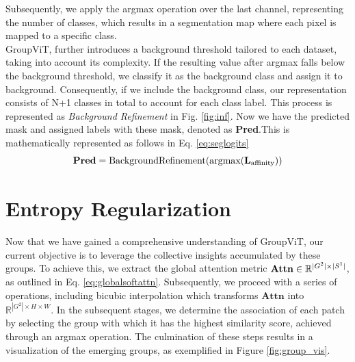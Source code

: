 Subsequently, we apply the argmax operation over the last channel, representing the number of classes, which results in a segmentation map where each pixel is mapped to a specific class.\\
GroupViT, further introduces a background threshold tailored to each dataset, taking into account its complexity. If the resulting value after argmax falls below the background threshold, we classify it as the background class and assign it to background. Consequently, if we include the background class, our representation consists of N+1 classes in total to account for each class label. This process is represented as \textit{Background Refinement} in Fig. \ref{fig:inf}. Now we have the predicted mask and assigned labels with these mask, denoted as \textbf{Pred}.This is mathematically represented as follows in Eq. \ref{eq:seglogits}
\begin{equation}
\label{eq:seglogits}
\text{\textbf{Pred}} = \text{BackgroundRefinement}(\text{argmax}(\text{\textbf{L}}_{\text{affinity}}))
\end{equation}

\section{Entropy Regularization}
\label{sec:entropyreg}
Now that we have gained a comprehensive understanding of GroupViT, our current objective is to leverage the collective insights accumulated by these groups. To achieve this, we extract the global attention metric $\text{\textbf{Attn}} \in \mathbb{R}^{|G^2| \times |S^1|}$, as outlined in Eq. \ref{eq:globalsoftattn}. Subsequently, we proceed with a series of operations, including bicubic interpolation which transforms $\textbf{Attn}$ into $\mathbb{R}^{|G^2| \times H \times W}$. In the subsequent stages, we determine the association of each patch by selecting the group with which it has the highest similarity score, achieved through an argmax operation. The culmination of these steps results in a visualization of the emerging groups, as exemplified in Figure \ref{fig:group_vis}.
% 


